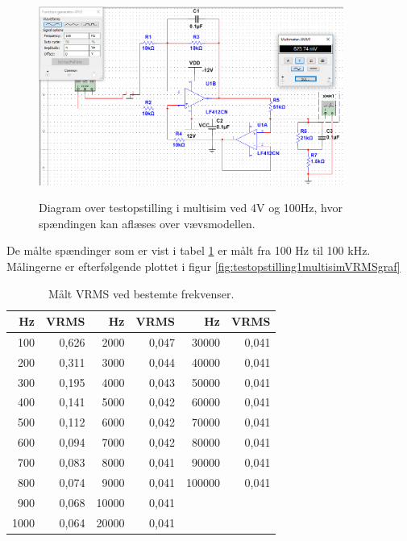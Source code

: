 \begin{figure}[H]
\centering
{\includegraphics[width=10cm]
{Figure/testopstilling1multisimRMS}}
\caption{Diagram over testopstilling i multisim ved 4V og 100Hz, hvor spændingen kan aflæses over vævsmodellen.}
\label{fig:testopstilling1multisimRMS}
\end{figure}

De målte spændinger som er vist i tabel \ref{table:frekvenservrms} er målt fra 100 Hz til 100 kHz.  Målingerne er efterfølgende plottet i figur  \ref{fig:testopstilling1multisimVRMSgraf} 

\begin{table}[H]
\centering
\begin{tabular}{| r | r || r | r || r | r |}
    \hline
    \textbf{Hz} & \textbf{VRMS} & \textbf{Hz} & \textbf{VRMS} & \textbf{Hz} & \textbf{VRMS}\\ \hline
    100 & 0,626 & 2000 & 0,047 & 30000 & 0,041 \\ \hline
    200 & 0,311 & 3000 & 0,044 & 40000 & 0,041   \\ \hline
    300 & 0,195 & 4000 & 0,043 & 50000 & 0,041   \\ \hline
    400 & 0,141 & 5000 & 0,042 & 60000 & 0,041   \\ \hline
    500 & 0,112 & 6000 & 0,042 & 70000 & 0,041  \\ \hline
    600 & 0,094 & 7000 & 0,042 & 80000 & 0,041   \\ \hline
    700 & 0,083 & 8000 & 0,041 & 90000 & 0,041  \\ \hline
    800 & 0,074 & 9000 & 0,041 & 100000 & 0,041   \\ \hline
    900 & 0,068 & 10000 & 0,041 &  &     \\ \hline
    1000 & 0,064 & 20000 & 0,041 & &   \\ \hline
\end{tabular}
    \caption{Målt VRMS ved bestemte frekvenser.}
    \label{table:frekvenservrms}
\end{table} 


